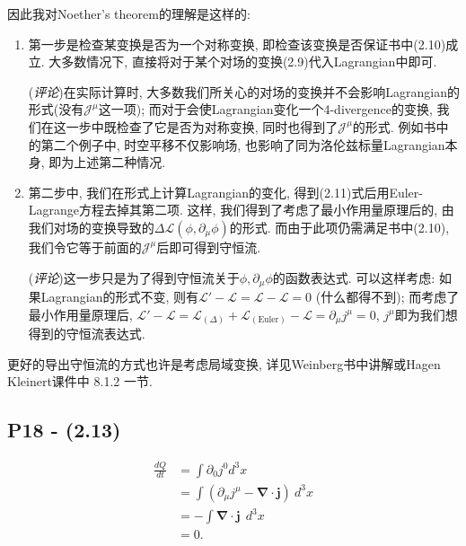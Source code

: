 因此我对Noether's theorem的理解是这样的:
\begin{enumerate}
  \item 第一步是检查某变换是否为一个对称变换, 即检查该变换是否保证书中(2.10)成立.
        大多数情况下, 直接将对于某个对场的变换(2.9)代入Lagrangian中即可.

        (\textit{评论})在实际计算时, 大多数我们所关心的对场的变换并不会影响Lagrangian的形式(没有$\mathcal{J}^{\mu}$这一项); 而对于会使Lagrangian变化一个4-divergence的变换, 我们在这一步中既检查了它是否为对称变换, 同时也得到了$\mathcal{J}^{\mu}$的形式.
        例如书中的第二个例子中, 时空平移不仅影响场, 也影响了同为洛伦兹标量Lagrangian本身, 即为上述第二种情况.
  \item 第二步中, 我们在形式上计算Lagrangian的变化, 得到(2.11)式后用Euler-Lagrange方程去掉其第二项.
        这样, 我们得到了考虑了最小作用量原理后的, 由我们对场的变换导致的$\Delta \mathcal{L}(\phi, \partial_\mu \phi)$的形式.
        而由于此项仍需满足书中(2.10), 我们令它等于前面的$\mathcal{J}^{\mu}$后即可得到守恒流.

        (\textit{评论})这一步只是为了得到守恒流关于$\phi, \partial_\mu \phi$的函数表达式.
        可以这样考虑: 如果Lagrangian的形式不变, 则有$\mathcal{L}'-\mathcal{L}=\mathcal{L}-\mathcal{L}=0$ (什么都得不到); 而考虑了最小作用量原理后, $\mathcal{L}'-\mathcal{L}=\mathcal{L}_{(\Delta)}+\mathcal{L}_{(\text{Euler})}-\mathcal{L}=\partial_{\mu}j^{\mu}=0$, $j^{\mu}$即为我们想得到的守恒流表达式.
\end{enumerate}

\begin{mybox}{}
  更好的导出守恒流的方式也许是考虑局域变换, 详见Weinberg书中讲解或Hagen Kleinert课件中 8.1.2 一节.
\end{mybox}

\subsection{P18 - (2.13)}
\begin{equation}
  \begin{aligned}
    \frac{dQ}{dt} & = \int \partial_0 j^0 d^3 x                                      \\
                  & = \int (\partial_\mu j^\mu - \bm{\nabla}\cdot\mathbf{j}) \ d^3 x \\
                  & = - \int \bm{\nabla}\cdot\mathbf{j}\ \ d^3 x                     \\
                  & =0.
  \end{aligned}
\end{equation}


